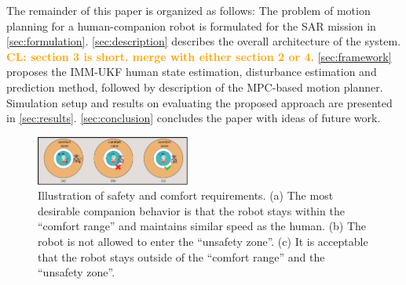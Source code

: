 \documentclass[journal]{IEEEtran}
\newcommand{\todohere}[1]{\hl{(\textbf{TODO:} #1)}}
\DeclareRobustCommand{\clnote}[1]{\ifthenelse{\boolean{include-notes}}%
	{\textcolor{orange}{\textbf{CL: #1}}}{}}
\begin{document}
	
	The remainder of this paper is organized as follows:
	The problem of motion planning for a human-companion robot is formulated for the SAR mission in \cref{sec:formulation}. 
	\cref{sec:description} describes the overall architecture of the system. \clnote{section 3 is short. merge with either section 2 or 4.}
	\cref{sec:framework} proposes the IMM-UKF human state estimation, disturbance estimation and prediction method, followed by description of the MPC-based motion planner.
	Simulation setup and results on evaluating the proposed approach are presented in \cref{sec:results}.
	\cref{sec:conclusion} concludes the paper with ideas of future work.
	
	\begin{figure}
		\centering		
		\includegraphics[width=0.45\textwidth]{figures/zone}		
		\caption{Illustration of safety and comfort requirements. (a) The most desirable companion behavior is that the robot stays within the ``comfort range'' and maintains similar speed as the human. (b) The robot is not allowed to enter the ``unsafety zone''. (c) It is acceptable that the robot stays outside of the ``comfort range'' and the ``unsafety zone''.}
		\label{fig:zone}
	\end{figure}	
	
\end{document}
